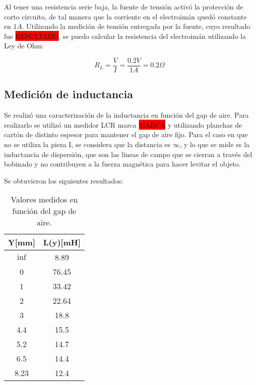 \noindent Al tener una resistencia serie baja, la fuente de tensión activó la protección de corto circuito, de tal manera que la corriente en el electroimán quedó constante en $1A$. Utilizando la medición de tensión entregada por la fuente, cuyo resultado fue \colorbox{red}{RESULTADO}, se puedo calcular la resistencia del electroimán utilizando la Ley de Ohm:

\begin{equation}
	R_{L}=\frac{V}{I}=\frac{0.2V}{1A}=0.2\Omega
\end{equation}

\subsection{Medición de inductancia}

\noindent Se realizó una caracterización de la inductancia en función del gap de aire. Para realizarlo se utilizó un medidor LCR marca \colorbox{red}{MARCA} y utilizando planchas de cartón de distinto espesor para mantener el gap de aire fijo. Para el caso en que no se utiliza la pieza I, se considera que la distancia es $\infty$, y lo que se mide es la inductancia de dispersión, que son las líneas de campo que se cierran a través del bobinado y no contribuyen a la fuerza magnética para hacer levitar el objeto.

\noindent Se obtuvieron los siguientes resultados:


\begin{table} [H]
	\begin{center}
		\begin{tabular}{| c | c |}
			\hline
			Y[mm] & L(y)[mH]\\ \hline
			$\inf$ & 8.89\\ \hline
			0 & 76.45\\ \hline
			1 & 33.42\\ \hline
			2 & 22.64\\ \hline
			3 & 18.8\\ \hline
			4.4 & 15.5\\ \hline
			5.2 & 14.7\\ \hline
			6.5 & 14.4\\ \hline
			8.23 & 12.4\\ \hline
		\end{tabular}
	\caption{Valores medidos en función del gap de aire.}
	\label{tab_mediciones_inductancia}
	\end{center}
\end{table}

